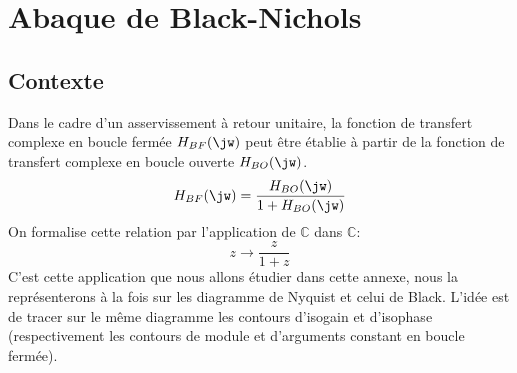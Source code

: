\chapter{Abaque de Black-Nichols~\label{annexe-blackNichols}}
\section{Contexte}

Dans le cadre d'un asservissement à retour unitaire, la fonction de transfert 
complexe en boucle fermée $H_{BF}(\jw)$ peut être établie à partir de la 
fonction de transfert complexe en boucle ouverte $H_{BO}(\jw)$.
\[
    H_{BF}(\jw)=\dfrac{H_{BO}(\jw)}{1+H_{BO}(\jw)}
\]
On formalise cette relation par l'application de $\mathbb{C}$ dans  $\mathbb{C}$:
\begin{equation*}
    z\to\dfrac{z}{1+z}
\end{equation*}
C'est cette application que nous allons étudier dans cette annexe, nous la 
représenterons à la fois sur les diagramme de Nyquist et celui de Black.
L'idée est de tracer sur le même diagramme les contours d'isogain et d'isophase 
(respectivement les contours de module et d'arguments constant 
en boucle fermée).
